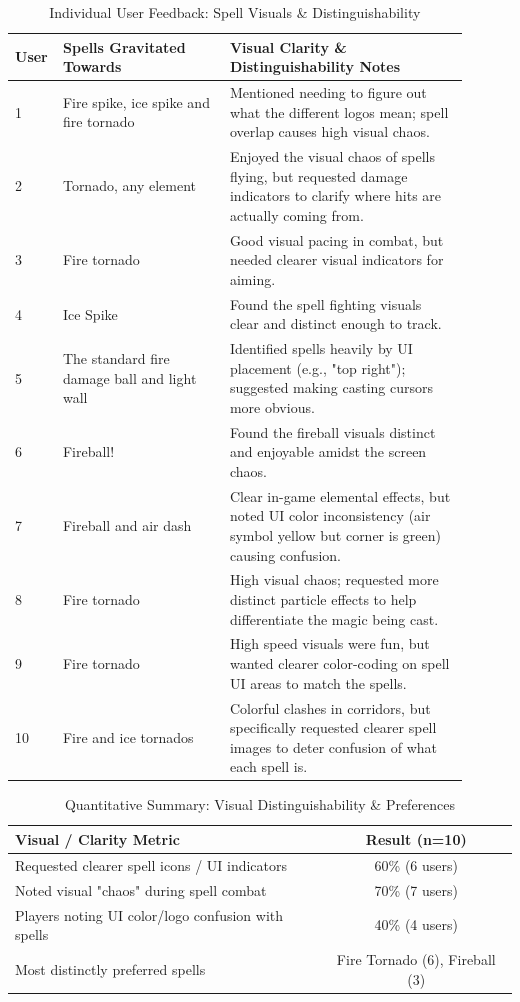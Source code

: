 \documentclass[12pt,a4paper]{report}
\begin{document}
\begin{table}[H]
\centering
\caption{Individual User Feedback: Spell Visuals \& Distinguishability}
\label{tab:spells1}
\begin{tabular}{p{0.05\linewidth} p{0.35\linewidth} p{0.5\linewidth}}
\hline
\textbf{User} & \textbf{Spells Gravitated Towards} & \textbf{Visual Clarity \& Distinguishability Notes} \\
\hline
1 & Fire spike, ice spike and fire tornado & Mentioned needing to figure out what the different logos mean; spell overlap causes high visual chaos. \\
2 & Tornado, any element & Enjoyed the visual chaos of spells flying, but requested damage indicators to clarify where hits are actually coming from. \\
3 & Fire tornado & Good visual pacing in combat, but needed clearer visual indicators for aiming. \\
4 & Ice Spike & Found the spell fighting visuals clear and distinct enough to track. \\
5 & The standard fire damage ball and light wall & Identified spells heavily by UI placement (e.g., "top right"); suggested making casting cursors more obvious. \\
6 & Fireball! & Found the fireball visuals distinct and enjoyable amidst the screen chaos. \\
7 & Fireball and air dash & Clear in-game elemental effects, but noted UI color inconsistency (air symbol yellow but corner is green) causing confusion. \\
8 & Fire tornado & High visual chaos; requested more distinct particle effects to help differentiate the magic being cast. \\
9 & Fire tornado & High speed visuals were fun, but wanted clearer color-coding on spell UI areas to match the spells. \\
10 & Fire and ice tornados & Colorful clashes in corridors, but specifically requested clearer spell images to deter confusion of what each spell is. \\
\hline
\end{tabular}
\end{table}

\begin{table}[H]
\centering
\caption{Quantitative Summary: Visual Distinguishability \& Preferences}
\label{tab:spells2}
\begin{tabular}{l c}
\hline
\textbf{Visual / Clarity Metric} & \textbf{Result (n=10)} \\
\hline
Requested clearer spell icons / UI indicators & 60\% (6 users) \\
Noted visual "chaos" during spell combat & 70\% (7 users) \\
Players noting UI color/logo confusion with spells & 40\% (4 users) \\
Most distinctly preferred spells & Fire Tornado (6), Fireball (3) \\
\hline
\end{tabular}
\end{table}
\end{document}
